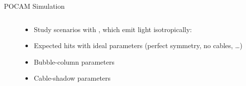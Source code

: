 
\begin{frame}[fragile]{POCAM Simulation}

  \begin{columns}
    \begin{column}{0.5\textwidth}
      \begin{overlayarea}{\textwidth}{\textheight}
        \vspace*{2cm}
      \end{overlayarea}
    \end{column}
    \begin{column}{0.5\textwidth}
      \begin{itemize}
        \item Study scenarios with , which emit light isotropically:
        \item Expected hits with ideal parameters (perfect symmetry, no cables, \dots)
        \item Bubble-column parameters
        \item Cable-shadow parameters
      \end{itemize}

    \end{column}
  \end{columns}

\end{frame}